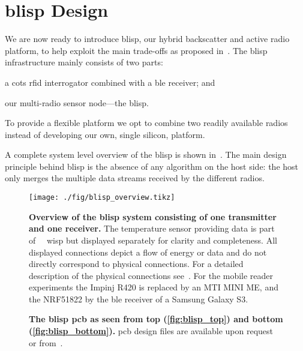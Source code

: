 \documentclass[conference,letterpaper,twoside,final,10pt]{IEEEtran}
\begin{document}
\section{\acs{blisp} Design}
\label{sec:blisp_design}

We are now ready to introduce \ac{blisp}, our hybrid backscatter and active radio platform, to help exploit the main trade-offs as proposed in~. 
The \ac{blisp} infrastructure mainly consists of two parts:
\begin{enumerate*}[label=(\roman*)]
	\item 	a \ac{cots} \acs{rfid} interrogator combined with a \ac{ble} receiver; and
	\item 	our multi-radio sensor node---the \ac{blisp}.
\end{enumerate*}
To provide a flexible platform we opt to combine two readily available radios instead of developing our own, single silicon, platform.

A complete system level overview of the \ac{blisp} is shown in~.
The main design principle behind \ac{blisp} is the absence of any algorithm on the host side: the host only merges the multiple data streams received by the different radios.

\begin{figure}
	\centering
	\texttt{[image: ./fig/blisp\_overview.tikz]}
	\caption{\textbf{Overview of the \acs{blisp} system consisting of one transmitter and one receiver.}
	The temperature sensor providing data is part of {~~}\ac{wisp} but displayed separately for clarity and completeness.
	All displayed connections depict a flow of energy or data and do not directly correspond to physical connections.
	For a detailed description of the physical connections see~\cite{blisp2015repo}.
	\textsuperscript{\dag}For the mobile reader experiments the Impinj R420 is replaced by an MTI MINI ME, and the NRF51822 by the \ac{ble} receiver of a Samsung Galaxy S3.}
	\label{fig:blisp_overview}
\end{figure}

\begin{figure}
	\centering
\caption{\textbf{The \acs{blisp} \ac{pcb} as seen from top (\cref{fig:blisp_top}) and bottom (\cref{fig:blisp_bottom}).}
		\ac{pcb} design files are available upon request or from~\cite{blisp2015repo}.
	}
	\label{fig:blisp_pcb}
\end{figure}
\end{document}
